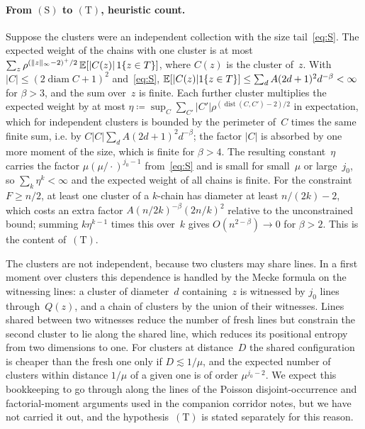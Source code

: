\documentclass[11pt,letterpaper]{article}
\begin{document}
\paragraph{From $\mathrm{(S)}$ to $\mathrm{(T)}$, heuristic count.} Suppose the clusters were an independent collection with the size tail~\eqref{eq:S}. The expected weight of the chains with one cluster is at most $\sum_{z}\rho^{(\lVert z\rVert_\infty-2)^+/2}\,\mathbb E[\lvert C(z)\rvert\,1\{z\in T\}]$, where $C(z)$ is the cluster of~$z$. With $\lvert C\rvert\le(2\operatorname{diam}C+1)^2$ and~\eqref{eq:S}, $\mathbb E[\lvert C(z)\rvert1\{z\in T\}]\le\sum_dA(2d+1)^2d^{-\beta}<\infty$ for $\beta>3$, and the sum over~$z$ is finite. Each further cluster multiplies the expected weight by at most $\eta\coloneqq\sup_C\sum_{C'}\lvert C'\rvert\rho^{(\operatorname{dist}(C,C')-2)/2}$ in expectation, which for independent clusters is bounded by the perimeter of~$C$ times the same finite sum, i.e. by $C\lvert C\rvert\sum_dA(2d+1)^2d^{-\beta}$; the factor $\lvert C\rvert$ is absorbed by one more moment of the size, which is finite for $\beta>4$. The resulting constant~$\eta$ carries the factor $\mu(\mu/\cdot)^{j_0-1}$ from~\eqref{eq:S} and is small for small~$\mu$ or large~$j_0$, so $\sum_k\eta^k<\infty$ and the expected weight of all chains is finite. For the constraint $F\ge n/2$, at least one cluster of a $k$-chain has diameter at least $n/(2k)-2$, which costs an extra factor $A(n/2k)^{-\beta}(2n/k)^2$ relative to the unconstrained bound; summing $k\eta^{k-1}$ times this over~$k$ gives $O(n^{2-\beta})\to0$ for $\beta>2$. This is the content of~$\mathrm{(T)}$.

The clusters are not independent, because two clusters may share lines. In a first moment over clusters this dependence is handled by the Mecke formula on the witnessing lines: a cluster of diameter~$d$ containing~$z$ is witnessed by $j_0$ lines through~$Q(z)$, and a chain of clusters by the union of their witnesses. Lines shared between two witnesses reduce the number of fresh lines but constrain the second cluster to lie along the shared line, which reduces its positional entropy from two dimensions to one. For clusters at distance~$D$ the shared configuration is cheaper than the fresh one only if $D\lesssim1/\mu$, and the expected number of clusters within distance $1/\mu$ of a given one is of order $\mu^{j_0-2}$. We expect this bookkeeping to go through along the lines of the Poisson disjoint-occurrence and factorial-moment arguments used in the companion corridor notes, but we have not carried it out, and the hypothesis~$\mathrm{(T)}$ is stated separately for this reason.
\end{document}
